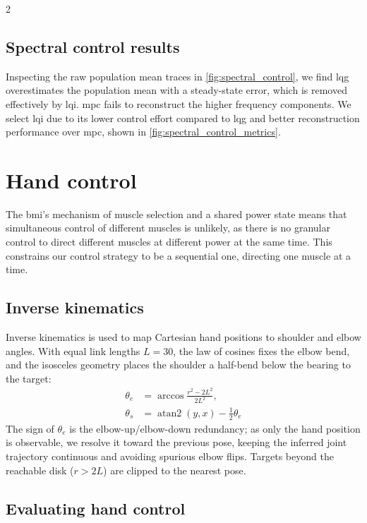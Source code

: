 \documentclass[a4paper, 10pt]{article}
\newcommand{\BMI}{\ac{bmi}\xspace}
\newcommand{\LQG}{\ac{lqg}\xspace}
\newcommand{\LQI}{\ac{lqi}\xspace}
\newcommand{\MPC}{\ac{mpc}\xspace}
\begin{document}
\begin{multicols*}{2}

  \subsection*{Spectral control results}

  Inspecting the raw population mean traces in \autoref{fig:spectral_control},
  we find \LQG overestimates the population mean with a steady-state error,
  which is removed effectively by \LQI. \MPC fails to reconstruct the higher
  frequency components. We select \LQI due to its lower control effort compared
  to \LQG and better reconstruction performance over \MPC, shown in
  \autoref{fig:spectral_control_metrics}.


  \section*{Hand control}

  The \BMI's mechanism of muscle selection and a shared power state means
  that simultaneous control of different muscles is unlikely, as there is no
  granular control to direct different muscles at different power at the same
  time. This constrains our control strategy to be a sequential one, directing
  one muscle at a time.

  \subsection*{Inverse kinematics}

  Inverse kinematics is used to map Cartesian hand positions to shoulder and
  elbow angles. With equal link lengths $L=30$, the law of cosines fixes the
  elbow bend, and the isosceles geometry places the shoulder a half-bend below
  the bearing to the target:
  \begin{align*}
    \theta_e & = \arccos\frac{r^2-2L^2}{2L^2},                  \\
    \theta_s & = \operatorname{atan2}(y,x)-\tfrac{1}{2}\theta_e
  \end{align*}
  The sign of $\theta_e$ is the elbow-up/elbow-down redundancy; as only the hand
  position is observable, we resolve it toward the previous pose, keeping the
  inferred joint trajectory continuous and avoiding spurious elbow flips.
  Targets beyond the reachable disk ($r>2L$) are clipped to the nearest pose.

  \subsection*{Evaluating hand control}


\end{multicols*}
\end{document}
